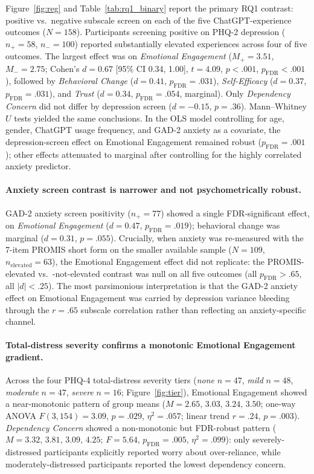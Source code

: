 \documentclass[letterpaper]{article}
\begin{document}
Figure~\ref{fig:reg} and Table~\ref{tab:rq1_binary} report the primary RQ1 contrast: positive vs.\ negative subscale screen on each of the five ChatGPT-experience outcomes ($N=158$). Participants screening positive on PHQ-2 depression ($n_+=58$, $n_-=100$) reported substantially elevated experiences across four of five outcomes. The largest effect was on \emph{Emotional Engagement} ($M_+=3.51$, $M_-=2.75$; Cohen's $d=0.67$ [95\% CI 0.34, 1.00], $t=4.09$, $p<.001$, $p_{\mathrm{FDR}}<.001$), followed by \emph{Behavioral Change} ($d=0.41$, $p_{\mathrm{FDR}}=.031$), \emph{Self-Efficacy} ($d=0.37$, $p_{\mathrm{FDR}}=.031$), and \emph{Trust} ($d=0.34$, $p_{\mathrm{FDR}}=.054$, marginal). Only \emph{Dependency Concern} did not differ by depression screen ($d=-0.15$, $p=.36$). Mann--Whitney $U$ tests yielded the same conclusions. In the OLS model controlling for age, gender, ChatGPT usage frequency, and GAD-2 anxiety as a covariate, the depression-screen effect on Emotional Engagement remained robust ($p_{\mathrm{FDR}}=.001$); other effects attenuated to marginal after controlling for the highly correlated anxiety predictor.

\paragraph{Anxiety screen contrast is narrower and not psychometrically robust.} GAD-2 anxiety screen positivity ($n_+=77$) showed a single FDR-significant effect, on \emph{Emotional Engagement} ($d=0.47$, $p_{\mathrm{FDR}}=.019$); behavioral change was marginal ($d=0.31$, $p=.055$). Crucially, when anxiety was re-measured with the 7-item PROMIS short form on the smaller available sample ($N=109$, $n_{\mathrm{elevated}}=63$), the Emotional Engagement effect did not replicate: the PROMIS-elevated vs.\ -not-elevated contrast was null on all five outcomes (all $p_{\mathrm{FDR}}>.65$, all $|d|<.25$). The most parsimonious interpretation is that the GAD-2 anxiety effect on Emotional Engagement was carried by depression variance bleeding through the $r=.65$ subscale correlation rather than reflecting an anxiety-specific channel.

\paragraph{Total-distress severity confirms a monotonic Emotional Engagement gradient.} Across the four PHQ-4 total-distress severity tiers (\emph{none} $n=47$, \emph{mild} $n=48$, \emph{moderate} $n=47$, \emph{severe} $n=16$; Figure~\ref{fig:tier}), Emotional Engagement showed a near-monotonic pattern of group means ($M=2.65,\,3.03,\,3.24,\,3.50$; one-way ANOVA $F(3,154)=3.09$, $p=.029$, $\eta^2=.057$; linear trend $r=.24$, $p=.003$). \emph{Dependency Concern} showed a non-monotonic but FDR-robust pattern ($M=3.32,\,3.81,\,3.09,\,4.25$; $F=5.64$, $p_{\mathrm{FDR}}=.005$, $\eta^2=.099$): only severely-distressed participants explicitly reported worry about over-reliance, while moderately-distressed participants reported the lowest dependency concern.
\end{document}
